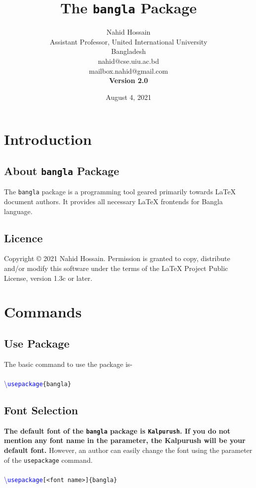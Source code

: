 \documentclass{article}
\newcommand{\com}[2]{\textcolor{blue}{\textbackslash\texttt{#1}}\texttt{#2}}
\begin{document}
\title{The \texttt{bangla} Package}

\author{Nahid Hossain \\Assistant Professor, United International University\\Bangladesh\\nahid@cse.uiu.ac.bd\\mailbox.nahid@gmail.com\\ \textbf{Version 2.0}}

\date{August 4, 2021}
\maketitle
\tableofcontents

\section{Introduction}
\subsection{About \texttt{bangla} Package}
The \texttt{bangla} package is a programming tool geared primarily towards LaTeX document authors. It provides all necessary LaTeX frontends for Bangla language.

\subsection{Licence}
Copyright © 2021 Nahid Hossain. Permission is granted to copy, distribute and/or modify this software under the terms of the LaTeX Project Public License, version 1.3c or later.
\section{Commands}
\subsection{Use Package}
The basic command to use the package is-\\ \\
\com{usepackage}{\{bangla\}}
    

\subsection{Font Selection}
\textbf{The default font of the \texttt{bangla} package is \texttt{Kalpurush}. If you do not mention any font name in the parameter, the Kalpurush will be your default font.} However, an author can easily change the font using the parameter of the \texttt{usepackage} command.
\\ \\ 
\com{usepackage}{[<font name>]\{bangla\}}
\\
\end{document}
